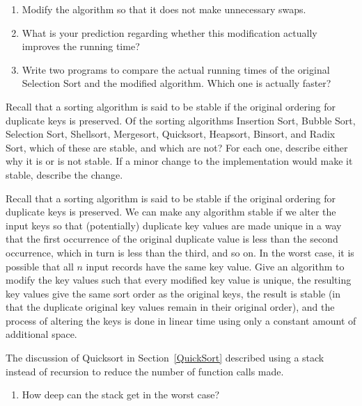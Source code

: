 \begin{exercises}
\begin{enumerate}
\item Modify the algorithm so that it does not make unnecessary
swaps.

\item What is your prediction regarding whether this modification
actually improves the running time?

\item Write two programs to compare the actual running times of
the original Selection Sort and the modified algorithm.
Which one is actually faster?
\end{enumerate}

\item
Recall that a sorting algorithm is said to be stable if the original
ordering for duplicate keys is preserved.
Of the sorting algorithms Insertion Sort, Bubble Sort, Selection Sort, 
Shellsort, Mergesort, Quicksort, Heapsort, Binsort, and Radix Sort,
which of these are stable, and which are not?
For each one, describe either why it is or is not stable.
If a minor change to the implementation would make it stable, describe
the change.

\item
Recall that a sorting algorithm is said to be stable if the original
ordering for duplicate keys is preserved.
We can make any algorithm stable if we alter the input keys so that
(potentially) duplicate key values are made unique in a way that the
first occurrence of the original duplicate value is less than the
second occurrence, which in turn is less than the third, and so on.
In the worst case, it is possible that all \(n\) input records have
the same key value.
Give an algorithm to modify the key values such that every modified
key value is unique, the resulting key values give the same sort order
as the original keys, the result is stable (in that the duplicate
original key values remain in their original order), and the process
of altering the keys is done in linear time using only a constant
amount of additional space.

\item
The discussion of Quicksort in Section~\ref{QuickSort} described using
a stack instead of recursion to reduce the number of function calls
made.

\begin{enumerate}
\item How deep can the stack get in the worst case?


\end{enumerate}
\end{exercises}
